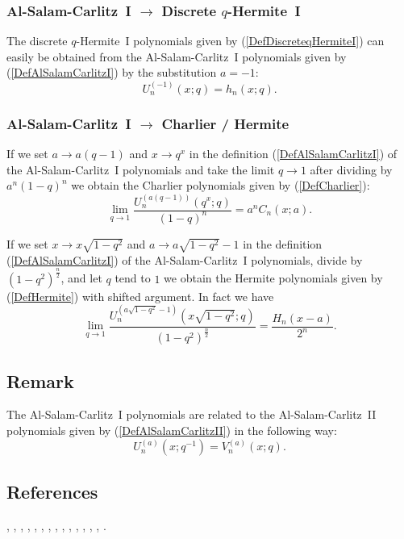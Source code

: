 \documentclass[envcountchap,graybox]{svmono}
\newcounter{rom}
\begin{document}
\subsubsection*{Al-Salam-Carlitz~I $\rightarrow$ Discrete $q$-Hermite~I}
The discrete $q$-Hermite~I polynomials given by
(\ref{DefDiscreteqHermiteI}) can easily be obtained from the
Al-Salam-Carlitz~I polynomials given by (\ref{DefAlSalamCarlitzI}) by the
substitution $a=-1$:
\begin{equation}
U_n^{(-1)}(x;q)=h_n(x;q).
\end{equation}

\subsubsection*{Al-Salam-Carlitz~I $\rightarrow$ Charlier / Hermite}
If we set $a\rightarrow a(q-1)$ and $x\rightarrow q^x$ in the definition
(\ref{DefAlSalamCarlitzI}) of the Al-Salam-Carlitz~I polynomials and take the
limit $q\rightarrow 1$ after dividing by $a^n(1-q)^n$ we obtain the Charlier
polynomials given by (\ref{DefCharlier}):
\begin{equation}
\lim_{q\rightarrow 1}\frac{U_n^{(a(q-1))}(q^x;q)}{(1-q)^n}=a^nC_n(x;a).
\end{equation}

If we set $x\rightarrow x\sqrt{1-q^2}$ and $a\rightarrow a\sqrt{1-q^2}-1$
in the definition (\ref{DefAlSalamCarlitzI}) of the Al-Salam-Carlitz~I
polynomials, divide by $(1-q^2)^{\frac{n}{2}}$, and let $q$ tend to $1$ we
obtain the Hermite polynomials given by (\ref{DefHermite}) with shifted
argument. In fact we have
\begin{equation}
\lim_{q\rightarrow 1}\frac{U_n^{(a\sqrt{1-q^2}-1)}(x\sqrt{1-q^2};q)}
{(1-q^2)^{\frac{n}{2}}}=\frac{H_n(x-a)}{2^n}.
\end{equation}

\subsection*{Remark}
The Al-Salam-Carlitz~I polynomials are related to the Al-Salam-Carlitz~II
polynomials given by (\ref{DefAlSalamCarlitzII}) in the following way:
$$U_n^{(a)}(x;q^{-1})=V_n^{(a)}(x;q).$$

\subsection*{References}
\cite{AlSalam90}, \cite{AlSalamCarlitz}, \cite{AlSalamChihara76}, \cite{AskeySuslovII},
\cite{AtakRahmanSuslov}, \cite{Chihara68II}, \cite{Chihara78}, \cite{DattaGriffin},
\cite{Dehesa}, \cite{DohaAhmed2005}, \cite{GasperRahman90}, \cite{Ismail85I},
\cite{IsmailMuldoon}, \cite{Kim}, \cite{Zeng95}.
\end{document}
